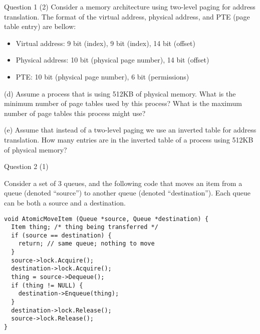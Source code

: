   \begin{frame}{Question 1 (2)}
    Consider a memory architecture using two-level paging for address
    translation.
    The format of the virtual address, physical address, and PTE (page table
    entry) are bellow:
    \begin{itemize}
      \item Virtual address: 9 bit (index), 9 bit (index), 14 bit (offset)
      \item Physical address: 10 bit (physical page number), 14 bit (offset)
      \item PTE: 10 bit (physical page number), 6 bit (permissions)
    \end{itemize}

    \vspace{1em}

    (d) Assume a process that is using 512KB of physical memory. What is the minimum
number of page tables used by this process? What is the maximum number of page tables
this process might use?

    \vspace{1em}

(e) Assume that instead of a two-level paging we use an inverted table for address
translation. How many entries are in the inverted table of a process using 512KB of
physical memory?
  \end{frame}

  \begin{frame}[fragile]{Question 2 (1)}

    Consider a set of 3 queues, and the following code that moves an item from a
    queue (denoted “source”) to another queue (denoted “destination”).
    Each queue can be both a source and a destination.

    \begin{lstlisting}
void AtomicMoveItem (Queue *source, Queue *destination) {
  Item thing; /* thing being transferred */
  if (source == destination) {
    return; // same queue; nothing to move
  }
  source->lock.Acquire();
  destination->lock.Acquire();
  thing = source->Dequeue();
  if (thing != NULL) {
    destination->Enqueue(thing);
  }
  destination->lock.Release();
  source->lock.Release();
}
    \end{lstlisting}
  \end{frame}

